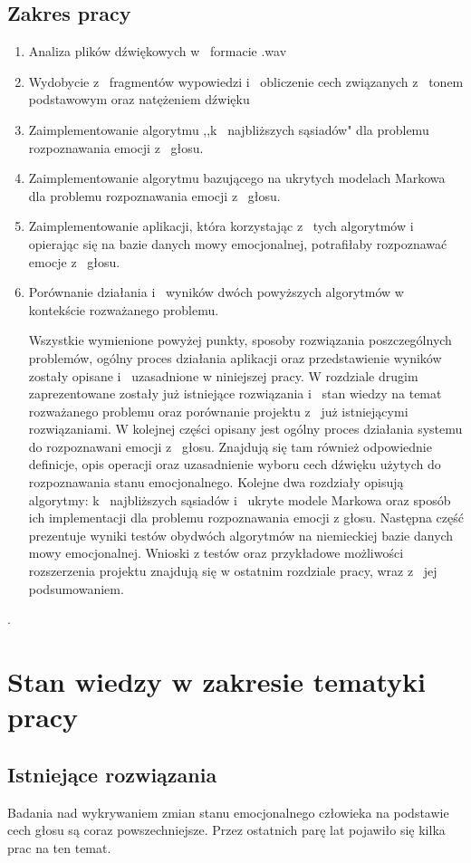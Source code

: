 \documentclass[declaration,shortabstract]{iithesis}
\begin{document}
\section{Zakres pracy}
\begin{enumerate}
\item Analiza plików dźwiękowych w~ formacie .wav
\item Wydobycie z~ fragmentów wypowiedzi i~ obliczenie cech związanych z~ tonem podstawowym oraz natężeniem dźwięku
\item Zaimplementowanie algorytmu ,,k~ najbliższych sąsiadów" dla problemu rozpoznawania emocji z~ głosu.
\item Zaimplementowanie algorytmu bazującego na ukrytych modelach Markowa dla problemu rozpoznawania emocji z~ głosu.
\item Zaimplementowanie aplikacji, która korzystając z~ tych algorytmów i~ opierając się na bazie danych mowy emocjonalnej, potrafiłaby rozpoznawać emocje z~ głosu.
\item Porównanie działania i~ wyników dwóch powyższych algorytmów w kontekście rozważanego problemu.

Wszystkie wymienione powyżej punkty, sposoby rozwiązania poszczególnych problemów, ogólny proces działania aplikacji oraz przedstawienie wyników zostały opisane i~ uzasadnione w niniejszej pracy. W rozdziale drugim zaprezentowane zostały już istniejące rozwiązania i~ stan wiedzy na temat rozważanego problemu oraz porównanie projektu z~ już istniejącymi rozwiązaniami. W kolejnej części opisany jest ogólny proces działania systemu do rozpoznawani emocji z~ głosu. Znajdują się tam również odpowiednie definicje, opis operacji oraz uzasadnienie wyboru cech dźwięku użytych do rozpoznawania stanu emocjonalnego. Kolejne dwa rozdziały opisują algorytmy: k~ najbliższych sąsiadów i~ ukryte modele Markowa oraz sposób ich implementacji dla problemu rozpoznawania emocji z głosu. Następna część prezentuje wyniki testów obydwóch algorytmów na niemieckiej bazie danych mowy emocjonalnej. Wnioski z testów oraz przykładowe możliwości rozszerzenia projektu znajdują się w ostatnim rozdziale pracy, wraz z~ jej podsumowaniem.

\end{enumerate}.

\chapter{Stan wiedzy w zakresie tematyki pracy}
\section{Istniejące rozwiązania}
Badania nad wykrywaniem zmian stanu emocjonalnego człowieka na podstawie cech głosu są coraz powszechniejsze. Przez ostatnich parę lat pojawiło się kilka prac na ten temat. 
\end{document}
